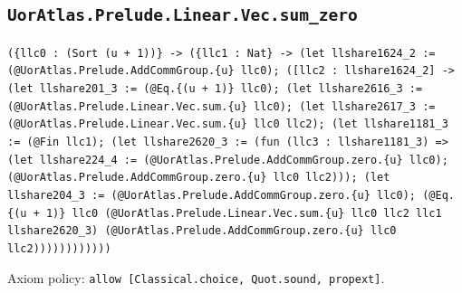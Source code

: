 \documentclass[11pt]{article}
\begin{document}
\subsection*{\texttt{UorAtlas.Prelude.Linear.Vec.sum\_zero}}
\noindent\texttt{(\{llc0 : (Sort (u + 1))\} -> (\{llc1 : Nat\} -> (let llshare1624\_2 := (@UorAtlas.Prelude.AddCommGroup.\{u\} llc0); ([llc2 : llshare1624\_2] -> (let llshare201\_3 := (@Eq.\{(u + 1)\} llc0); (let llshare2616\_3 := (@UorAtlas.Prelude.Linear.Vec.sum.\{u\} llc0); (let llshare2617\_3 := (@UorAtlas.Prelude.Linear.Vec.sum.\{u\} llc0 llc2); (let llshare1181\_3 := (@Fin llc1); (let llshare2620\_3 := (fun (llc3 : llshare1181\_3) => (let llshare224\_4 := (@UorAtlas.Prelude.AddCommGroup.zero.\{u\} llc0); (@UorAtlas.Prelude.AddCommGroup.zero.\{u\} llc0 llc2))); (let llshare204\_3 := (@UorAtlas.Prelude.AddCommGroup.zero.\{u\} llc0); (@Eq.\{(u + 1)\} llc0 (@UorAtlas.Prelude.Linear.Vec.sum.\{u\} llc0 llc2 llc1 llshare2620\_3) (@UorAtlas.Prelude.AddCommGroup.zero.\{u\} llc0 llc2))))))))))))}\par
\noindent Axiom policy: \texttt{allow [Classical.choice, Quot.sound, propext]}.\par
\end{document}
